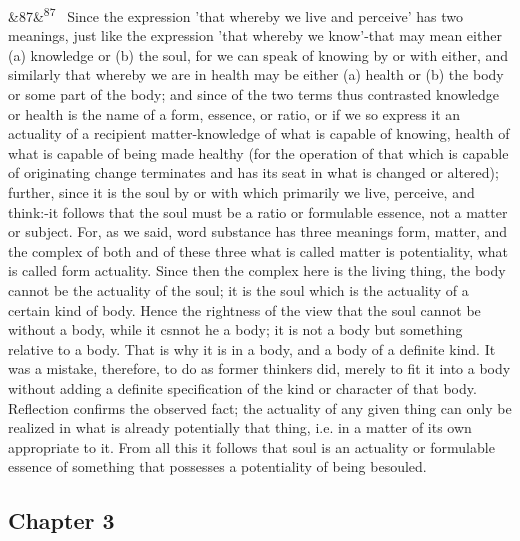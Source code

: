 \documentclass[12pt]{article}
\newcommand{\para}[1][]{\par\noindent\ifx&#1&\else\textsuperscript{\footnotesize #1}~\fi}
\begin{document}
\para[87] Since the expression 'that whereby we live and perceive' has two meanings, just like the expression 'that whereby we know'-that may mean either (a) knowledge or (b) the soul, for we can speak of knowing by or with either, and similarly that whereby we are in health may be either (a) health or (b) the body or some part of the body; and since of the two terms thus contrasted knowledge or health is the name of a form, essence, or ratio, or if we so express it an actuality of a recipient matter-knowledge of what is capable of knowing, health of what is capable of being made healthy (for the operation of that which is capable of originating change terminates and has its seat in what is changed or altered); further, since it is the soul by or with which primarily we live, perceive, and think:-it follows that the soul must be a ratio or formulable essence, not a matter or subject. For, as we said, word substance has three meanings form, matter, and the complex of both and of these three what is called matter is potentiality, what is called form actuality. Since then the complex here is the living thing, the body cannot be the actuality of the soul; it is the soul which is the actuality of a certain kind of body. Hence the rightness of the view that the soul cannot be without a body, while it csnnot he a body; it is not a body but something relative to a body. That is why it is in a body, and a body of a definite kind. It was a mistake, therefore, to do as former thinkers did, merely to fit it into a body without adding a definite specification of the kind or character of that body. Reflection confirms the observed fact; the actuality of any given thing can only be realized in what is already potentially that thing, i.e. in a matter of its own appropriate to it. From all this it follows that soul is an actuality or formulable essence of something that possesses a potentiality of being besouled.

\subsection*{Chapter 3}
\end{document}
